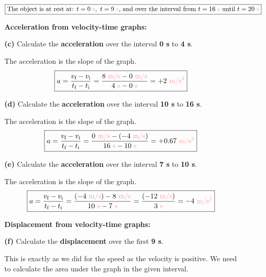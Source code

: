 \documentclass[A4,12pt]{article}
\begin{document}
\begin{enumerate}[label=\bfseries (\arabic*)]
\begin{itemize}
\begin{example}
    \begin{equation*}
        \boxed{\text{The object is at rest at: } \tsis{t=0},\,\,\tsis{t=9}\text{, and over the interval from }t=\tsis{16}\text{ until } t=\tsis{20}}
    \end{equation*}
    \end{example}
    \item[] {\bf Acceleration from velocity-time graphs:}
    \item[\bf (c)] Calculate the \textbf{acceleration} over the interval \textbf{0 s} to \textbf{4 s}.
    \begin{example}
    The acceleration is the slope of the graph.
    \begin{equation*}
       \boxed{a=\frac{v_\text{f}-v_\text{i}}{t_\text{f}-t_\text{i}}=\frac{\vsis{8}-\vsis{0}}{\tsis{4}-\tsis{0}}=\asis{+2}}
    \end{equation*}
    \end{example}
    \item[\bf (d)] Calculate the \textbf{acceleration} over the interval \textbf{10 s} to \textbf{16 s}.
    \begin{example}
    The acceleration is the slope of the graph.
    \begin{equation*}
       \boxed{a=\frac{v_\text{f}-v_\text{i}}{t_\text{f}-t_\text{i}}=\frac{\vsis{0}-(\vsis{-4})}{\tsis{16}-\tsis{10}}=\asis{+0.67}}
    \end{equation*}
    \end{example}
    \item[\bf (e)] Calculate the \textbf{acceleration} over the interval \textbf{7 s} to \textbf{10 s}.
    \begin{example}
    The acceleration is the slope of the graph.
    \begin{equation*}
       \boxed{a=\frac{v_\text{f}-v_\text{i}}{t_\text{f}-t_\text{i}}=\frac{(\vsis{-4})-\vsis{8}}{\tsis{10}-\tsis{7}}=\frac{(\vsis{-12})}{\tsis{3}}=\asis{-4}}
    \end{equation*}
    \end{example}
    \item[] {\bf Displacement from velocity-time graphs:}
    \item[\bf (f)] Calculate the \textbf{displacement} over the first \textbf{9 s}.
    \begin{example}
    This is exactly as we did for the speed as the velocity is positive. We need to calculate the area under the graph in the given interval.
    

\end{example}
\end{itemize}
\end{enumerate}
\end{document}
